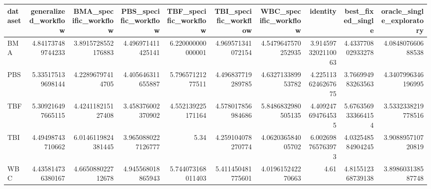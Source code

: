 \begin{tabular}{lrrrrrrrrr}
\hline
dataset & generalized\_workflow & BMA\_specific\_workflow & PBS\_specific\_workflow & TBF\_specific\_workflow & TBI\_specific\_workflow & WBC\_specific\_workflow & identity & best\_fixed\_single & oracle\_single\_exploratory \\
\hline
BMA & 4.841737489744233 & 3.8915728552176883 & 4.496971411425141 & 6.220000000000001 & 4.969571341072154 & 4.5479647570252935 & 3.9145973202110063 & 4.433770802933278 & 4.084807660688538 \\
PBS & 5.335175139698144 & 4.22896797414705 & 4.405646311655887 & 5.79657121277511 & 4.496837719289785 & 4.632713389953782 & 4.2251136246267675 & 3.766994983263563 & 4.3407996346196995 \\
TBF & 5.309216497665115 & 4.424118215127408 & 3.458376002370902 & 4.552139225171164 & 4.578017856984686 & 5.8486832980505135 & 4.409247694764535 & 5.6763569333664154 & 3.5332338219778516 \\
TBI & 4.49498743710662 & 6.0146119824381445 & 3.9650880227126777 & 5.34 & 4.259104078270774 & 4.062036584005702 & 6.002698765763973 & 4.032548584904245 & 3.908895710720819 \\
WBC & 4.435814736380167 & 4.665088022712678 & 4.945568018865943 & 5.744073168011403 & 5.411450481775601 & 4.019615242270663 & 4.61 & 4.815512368739138 & 3.898603138587748 \\
\hline
\end{tabular}
